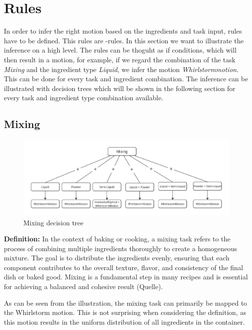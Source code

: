 \section{Rules}
In order to infer the right motion based on the ingredients and task input, rules have to be defined. This rules are -rules.
In this section we want to illustrate the inference on a high level.
The rules can be thoguht as if conditions, which will then result in a motion, 
for example, if we regard the combination of the task \textit{Mixing} and the ingredient type \textit{Liquid}, we infer the motion \textit{Whirlstormmotion}. 
This can be done for every task and ingredient combination. 
The inference can be illustrated with decision trees which will be shown in the following section for every task and ingredient type combination available. 

\subsection{Mixing}
\begin{figure}[H]
\includegraphics[scale=0.25]{Graphics/MixingDecisionTree.jpg}
\caption{Mixing decision tree}
\end{figure}
\textbf{Definition:} In the context of baking or cooking, a mixing task refers to the process of combining multiple ingredients thoroughly to create a homogeneous mixture. The goal is to distribute the ingredients evenly, ensuring that each component contributes to the overall texture, flavor, and consistency of the final dish or baked good. Mixing is a fundamental step in many recipes and is essential for achieving a balanced and cohesive result (Quelle).


As can be seen from the illustration, the mixing task can primarily be mapped to the Whirlstorm motion. This is not surprising when considering the definition, as this motion results in the uniform distribution of all ingredients in the container.
